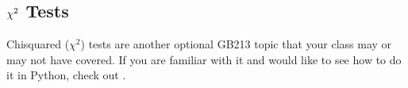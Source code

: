 \documentclass[letterpaper,10pt,english]{sphinxmanual}
\begin{document}
\subsection{\protect\(\chi^2\protect\) Tests}
\label{\detokenize{GB213-review-in-Python:chi-2-tests}}
Chi\sphinxhyphen{}squared (\(\chi^2\)) tests are another optional GB213 topic that your class may or may not have covered.  If you are familiar with it and would like to see how to do it in Python, check out .







\renewcommand{\indexname}{Index}
\printindex
\end{document}
